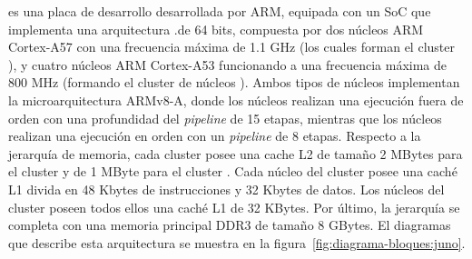 \junodp es una placa de desarrollo desarrollada por ARM, equipada con un
SoC que implementa una arquitectura \BIG.\LITTLE de 64 bits, compuesta por
dos núcleos ARM Cortex-A57 con una frecuencia máxima de 1.1 GHz (los cuales
forman el cluster \BIG), y cuatro núcleos ARM Cortex-A53 funcionando a una
frecuencia máxima de 800 MHz (formando el cluster de núcleos
\LITTLE). Ambos tipos de núcleos implementan la microarquitectura ARMv8-A,
donde los núcleos \BIG realizan una ejecución fuera de orden con una
profundidad del \emph{pipeline} de 15 etapas, mientras que los núcleos
\LITTLE realizan una ejecución en orden con un \emph{pipeline} de 8 etapas.
Respecto a la jerarquía de memoria, cada cluster posee una cache L2 de
tamaño 2 MBytes para el cluster \BIG y de 1 MByte para el cluster
\LITTLE. Cada núcleo del cluster \BIG posee una caché L1 divida en 48
Kbytes de instrucciones y 32 Kbytes de datos. Los núcleos del cluster
\LITTLE poseen todos ellos una caché L1 de 32 KBytes. Por último, la
jerarquía se completa con una memoria principal DDR3 de tamaño 8 GBytes.
El diagramas que describe esta arquitectura se muestra en la
figura~\ref{fig:diagrama-bloques:juno}.

